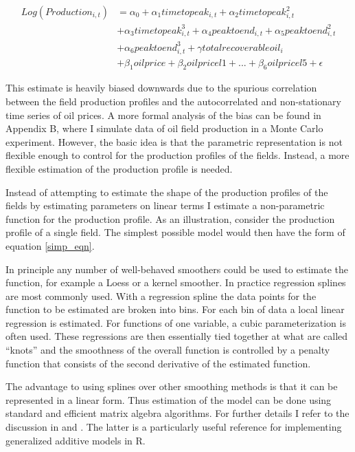 \documentclass[11pt]{article}
\begin{document}
	\begin{equation}
	\begin{split}	
	 Log(Production_{i,t})  &= \alpha_0 + \alpha_1 timetopeak_{i,t} + \alpha_2 timetopeak_{i,t}^2 \\
	  \quad & + \alpha_3 timetopeak_{i,t}^3  + \alpha_4 peaktoend_{i,t} + \alpha_5 peaktoend_{i,t}^2 \\
	  \quad & + \alpha_6 peaktoend_{i,t}^3 + \gamma totalrecoverableoil_i \\
	  \quad & + \beta_1 oilprice + \beta_2 oilpricel1 + ...+ \beta_6 oilpricel5 + \epsilon	
	\label{glm_eqn}
	\end{split}
	\end{equation}

  


This estimate is heavily biased downwards due to the spurious correlation between the field production profiles and the autocorrelated and non-stationary time series of oil prices.  A more formal analysis of the bias can be found in Appendix B, where I simulate data of oil field production in a Monte Carlo experiment.  However, the basic idea is that the parametric representation is not flexible enough to control for the production profiles of the fields.   Instead, a more flexible estimation of the production profile is needed. 

Instead of attempting to estimate the shape of the production profiles of the fields by estimating parameters on linear terms I estimate a non-parametric function for the production profile.  As an illustration, consider the production profile of a single field.  The simplest possible model would then have the form of equation \ref{simp_eqn}. 

In principle any number of well-behaved smoothers could be used to estimate the function, for example a Loess or a kernel smoother.  In practice regression splines are most commonly used.  With a regression spline the data points for the function to be estimated are broken into bins.  For each bin of data a local linear regression is estimated.  For functions of one variable, a cubic parameterization is often used.  These regressions are then essentially tied together at what are called “knots” and the smoothness of the overall function is controlled by a penalty function that consists of the second derivative of the estimated function.

The advantage to using splines over other smoothing methods is that it can be represented in a linear form.  Thus estimation of the model can be done using standard and efficient matrix algebra algorithms. For further details I refer to the discussion in \citet{hastie_generalized_1990} and \citet{wood_generalized_2006}.  The latter is a particularly useful reference for implementing generalized additive models in R.
\end{document}
